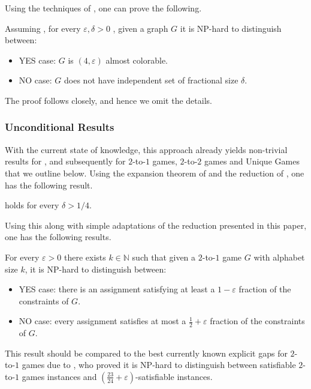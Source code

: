 \documentclass{toc}
\newcommand\eps{\varepsilon}
\begin{document}
Using the techniques of \cite{DKPS}, one can prove the following.
\begin{corollary}
Assuming ,
for every $\eps,\delta>0$ ,
given a graph $G$ it is NP-hard
to distinguish between:
\begin{itemize}
  \item YES case: $G$ is $(4,\eps)$ almost colorable.
  \item NO case: $G$ does not have independent set of fractional size $\delta$.
\end{itemize}
\end{corollary}
The proof follows \cite{DKPS} closely, and hence we omit the details.




\subsubsection*{Unconditional Results}
With the current state of knowledge, this approach already yields non-trivial results for
%
,  %
and subsequently for $2$-to-$1$ games, $2$-to-$2$ games and Unique Games that we outline below.
Using the expansion theorem of \cite{DKKMSgras} and the reduction of \cite{BKS}, one has the following
result.
%
\begin{theorem}
 holds for every $\delta>1/4$.
\end{theorem}

Using this along with simple adaptations of the reduction presented in this paper, one has the following results.
\begin{theorem}
For every $\eps>0$ there exists $k\in\mathbb{N}$ such that given a $2$-to-$1$ game $G$ with alphabet size $k$, it
is NP-hard to distinguish between:
\begin{itemize}
  \item YES case: there is an assignment satisfying at least
  a %
   $1-\eps$ fraction of the constraints of $G$.
  \item NO case: every assignment satisfies at most
  a %
  $\frac{1}{2}+\eps$ fraction of the constraints of $G$.
\end{itemize}
\end{theorem}

This result should be compared to the best currently known explicit gaps for $2$-to-$1$ games due to
\cite{AOTW}, who proved it is NP-hard to distinguish between satisfiable $2$-to-$1$ games instances and
$\left(\frac{23}{24}+\eps\right)$-satisfiable instances.
\end{document}
